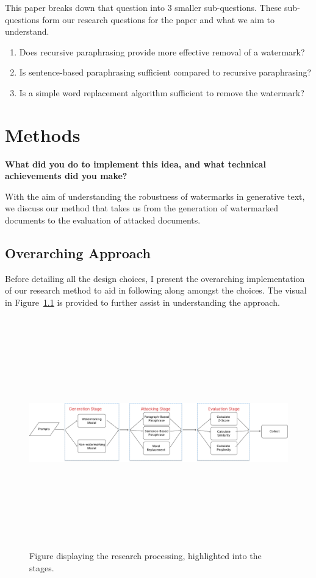 \documentclass{l4proj}
\theoremstyle{definition}
\begin{document}
        This paper breaks down that question into 3 smaller sub-questions. These sub-questions form our research questions for the paper and what we aim to understand.
        \begin{enumerate}[label={\textbf{RQ\arabic*}:}, leftmargin=4em]
            \item Does recursive paraphrasing provide more effective removal of a watermark?
            \item Is sentence-based paraphrasing sufficient compared to recursive paraphrasing?
            \item Is a simple word replacement algorithm sufficient to remove the watermark?
        \end{enumerate}

    
\chapter{Methods}
\textbf{What did you do to implement this idea, and what technical achievements did you make?}

With the aim of understanding the robustness of watermarks in generative text, we discuss our method that takes us from the generation of watermarked documents to the evaluation of attacked documents.

\section{Overarching Approach}
    Before detailing all the design choices, I present the overarching implementation of our research method to aid in following along amongst the choices. The visual in Figure~\ref{fig:method-flow-chart} is provided to further assist in understanding the approach.

    \begin{figure}[h]
        \centering
         \includegraphics[height=10cm, width=1\linewidth, keepaspectratio]{images/methods/research-process.pdf}
        \caption{Figure displaying the research processing, highlighted into the stages.}
        \label{fig:method-flow-chart} 
    \end{figure}
    
\end{document}
